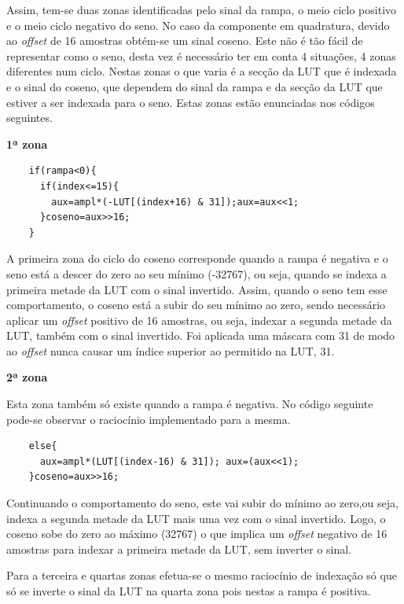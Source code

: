 \documentclass[11pt]{article}
\numberwithin{equation}{section}
\begin{document}
Assim, tem-se duas zonas identificadas pelo sinal da rampa, o meio ciclo positivo e o meio ciclo negativo do seno.
No caso da componente em quadratura, devido ao \textit{offset} de 16 amostras obtém-se um sinal coseno. Este não é tão fácil de representar como o seno, desta vez é necessário ter em conta 4 situações, 4 zonas diferentes num ciclo. Nestas zonas o que varia é a secção da LUT que é indexada e o sinal do coseno, que dependem do sinal da rampa e da secção da LUT que estiver a ser indexada para o seno. Estas zonas estão enunciadas nos códigos seguintes.
\vspace{1mm}

\textbf{1ª zona}
\begin{lstlisting}
	if(rampa<0){
	  if(index<=15){
	    aux=ampl*(-LUT[(index+16) & 31]);aux=aux<<1;
	  }coseno=aux>>16;
	}
\end{lstlisting}

A primeira zona do ciclo do coseno corresponde quando a rampa é negativa e o seno está a descer do zero ao seu mínimo (-32767), ou seja, quando se indexa a primeira metade da LUT com o sinal invertido. Assim, quando o seno tem esse comportamento, o coseno está a subir do seu mínimo ao zero, sendo necessário aplicar um \textit{offset} positivo de 16 amostras, ou seja, indexar a segunda metade da LUT, também com o sinal invertido. Foi aplicada uma máscara com 31 de modo ao \textit{offset} nunca causar um índice superior ao permitido na LUT, 31.
\vspace{1mm}

\textbf{2ª zona}

Esta zona também só existe quando a rampa é negativa. No código seguinte pode-se observar o raciocínio implementado para a mesma.
\begin{lstlisting}
	else{
	  aux=ampl*(LUT[(index-16) & 31]); aux=(aux<<1);
	}coseno=aux>>16;
\end{lstlisting}

Continuando o comportamento do seno, este vai subir do mínimo ao zero,ou seja, indexa a segunda metade da LUT mais uma vez com o sinal invertido. Logo, o coseno sobe do zero ao máximo (32767) o que implica um \textit{offset} negativo de 16 amostras para indexar a primeira metade da LUT, sem inverter o sinal.

Para a terceira e quartas zonas efetua-se o mesmo raciocínio de indexação só que só se inverte o sinal da LUT na quarta zona pois nestas a rampa é positiva.
\vspace{1mm}
\end{document}
